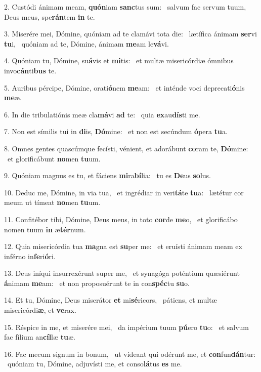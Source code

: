 2. Custódi ánimam meam, \textbf{quón}iam \textbf{sanc}tus sum: \ast\  salvum fac servum tuum, Deus meus, spe\textbf{rán}tem \textbf{in} te.\

3. Miserére mei, Dómine, quóniam ad te clamávi tota die: \dag\  lætífica ánimam \textbf{ser}vi \textbf{tu}i, \ast\  quóniam ad te, Dómine, ánimam \textbf{me}am le\textbf{vá}vi.\

4. Quóniam tu, Dómine, su\textbf{á}vis et \textbf{mi}tis: \ast\  et multæ misericórdiæ ómnibus invo\textbf{cán}ti\textbf{bus} te.\

5. Auribus pércipe, Dómine, orati\textbf{ó}nem \textbf{me}am: \ast\  et inténde voci deprecati\textbf{ó}nis \textbf{me}æ.\

6. In die tribulatiónis meæ cla\textbf{má}vi \textbf{ad} te: \ast\  quia \textbf{ex}au\textbf{dís}ti me.\

7. Non est símilis tui in \textbf{di}is, \textbf{Dó}mine: \ast\  et non est secúndum \textbf{ó}pera \textbf{tu}a.\

8. Omnes gentes quascúmque fecísti, vénient, et adorábunt \textbf{co}ram te, \textbf{Dó}mine: \ast\  et glorificábunt \textbf{no}men \textbf{tu}um.\

9. Quóniam magnus es tu, et fáciens \textbf{mi}ra\textbf{bí}lia: \ast\  tu es \textbf{De}us \textbf{so}lus.\

10. Deduc me, Dómine, in via tua, \dag\  et ingrédiar in veri\textbf{tá}te \textbf{tu}a: \ast\  lætétur cor meum ut tímeat \textbf{no}men \textbf{tu}um.\

11. Confitébor tibi, Dómine, Deus meus, in toto \textbf{cor}de \textbf{me}o, \ast\  et glorificábo nomen tuum \textbf{in} æ\textbf{tér}num.\

12. Quia misericórdia tua \textbf{ma}gna est \textbf{su}per me: \ast\  et eruísti ánimam meam ex inférno in\textbf{fe}ri\textbf{ó}ri.\

13. Deus iníqui insurrexérunt super me, \dag\  et synagóga poténtium quæsiérunt \textbf{á}nimam \textbf{me}am: \ast\  et non proposuérunt te in con\textbf{spéc}tu \textbf{su}o.\

14. Et tu, Dómine, Deus miserátor \textbf{et} mi\textbf{sé}ricors, \ast\  pátiens, et multæ misericórdi\textbf{æ}, et \textbf{ve}rax.\

15. Réspice in me, et miserére mei, \dag\  da impérium tuum \textbf{pú}ero \textbf{tu}o: \ast\  et salvum fac fílium an\textbf{cíl}læ \textbf{tu}æ.\

16. Fac mecum signum in bonum, \dag\  ut vídeant qui odérunt me, et \textbf{con}fun\textbf{dán}tur: \ast\  quóniam tu, Dómine, adjuvísti me, et conso\textbf{lá}tus \textbf{es} me.\


